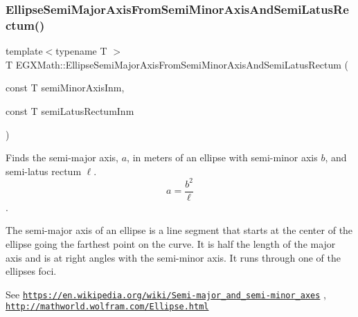 \mbox{\label{group___e_g_x_math-_geometry-2_d-_ellipse-_semi_major_axis_ga1352fb9ee77a05d6b5d733c0fa048479}} 
\subsubsection{\texorpdfstring{Ellipse\+Semi\+Major\+Axis\+From\+Semi\+Minor\+Axis\+And\+Semi\+Latus\+Rectum()}{EllipseSemiMajorAxisFromSemiMinorAxisAndSemiLatusRectum()}}
{\footnotesize\ttfamily template$<$typename T $>$ \\
T E\+G\+X\+Math\+::\+Ellipse\+Semi\+Major\+Axis\+From\+Semi\+Minor\+Axis\+And\+Semi\+Latus\+Rectum (\begin{DoxyParamCaption}\item[{const T}]{semi\+Minor\+Axis\+Inm,  }\item[{const T}]{semi\+Latus\+Rectum\+Inm }\end{DoxyParamCaption})}



Finds the semi-\/major axis, $a$, in meters of an ellipse with semi-\/minor axis $b$, and semi-\/latus rectum $\ell$. \[ a= \frac{b^2}{\ell} \]. 

The semi-\/major axis of an ellipse is a line segment that starts at the center of the ellipse going the farthest point on the curve. It is half the length of the major axis and is at right angles with the semi-\/minor axis. It runs through one of the ellipses foci.

See \href{https://en.wikipedia.org/wiki/Semi-major_and_semi-minor_axes}{\tt https\+://en.\+wikipedia.\+org/wiki/\+Semi-\/major\+\_\+and\+\_\+semi-\/minor\+\_\+axes} , \href{http://mathworld.wolfram.com/Ellipse.html}{\tt http\+://mathworld.\+wolfram.\+com/\+Ellipse.\+html}


